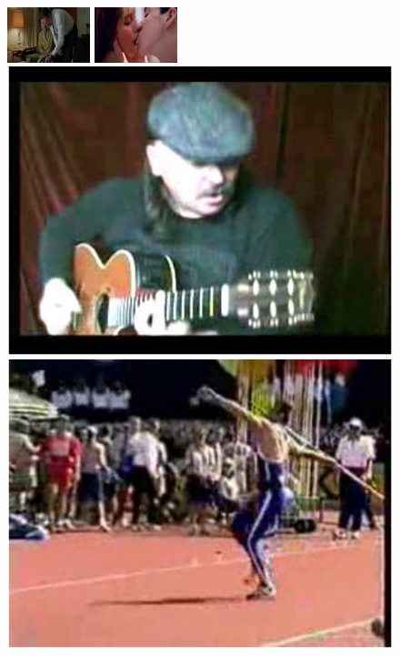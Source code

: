 \documentclass[10pt,twocolumn,letterpaper]{article}
\begin{document}
\begin{figure}[!t]
\begin{center}
\includegraphics[height=1.61cm]{figures/dataset_thumb/hwd/class5.jpg}
\includegraphics[height=1.61cm]{figures/dataset_thumb/hwd/class6.jpg} \\
\includegraphics[scale=0.305]{figures/dataset_thumb/ucf/crop_class1.pdf}
\includegraphics[scale=0.305]{figures/dataset_thumb/ucf/crop_class2.pdf}

\end{center}
\end{figure}
\end{document}
